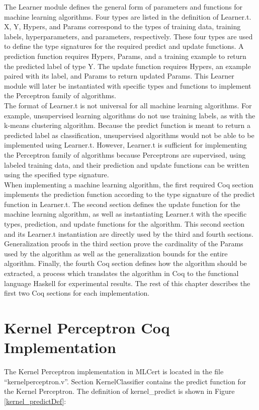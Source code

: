 The Learner module defines the general form of parameters and functions for machine learning algorithms. Four types are listed in the definition of Learner.t. X, Y, Hypers, and Params correspond to the types of training data, training labels, hyperparameters, and parameters, respectively. These four types are used to define the type signatures for the required predict and update functions. A prediction function requires Hypers, Params, and a training example to return the predicted label of type Y. The update function requires Hypers, an example paired with its label, and Params to return updated Params. This Learner module will later be instantiated with specific types and functions to implement the Perceptron family of algorithms. 
\\The format of Learner.t is not universal for all machine learning algorithms. For example, unsupervised learning algorithms do not use training labels, as with the k-means clustering algorithm. Because the predict function is meant to return a predicted label as classification, unsupervised algorithms would not be able to be implemented using Learner.t. However, Learner.t is sufficient for implementing the Perceptron family of algorithms because Perceptrons are supervised, using labeled training data, and their prediction and update functions can be written using the specified type signature.
\\When implementing a machine learning algorithm, the first required Coq section implements the prediction function according to the type signature of the predict function in Learner.t. The second section defines the update function for the machine learning algorithm, as well as instantiating Learner.t with the specific types, prediction, and update functions for the algorithm. This second section and its Learner.t instantiation are directly used by the third and fourth sections. Generalization proofs in the third section prove the cardinality of the Params used by the algorithm as well as the generalization bounds for the entire algorithm. Finally, the fourth Coq section defines how the algorithm should be extracted, a process which translates the algorithm in Coq to the functional language Haskell for experimental results. The rest of this chapter describes the first two Coq sections for each implementation.
\section{Kernel Perceptron Coq Implementation}\label{KPCoqImp}
The Kernel Perceptron implementation in MLCert is located in the file ``kernelperceptron.v''. Section KernelClassifier contains the predict function for the Kernel Perceptron. The definition of kernel\_predict is shown in Figure \ref{kernel_predictDef}:

